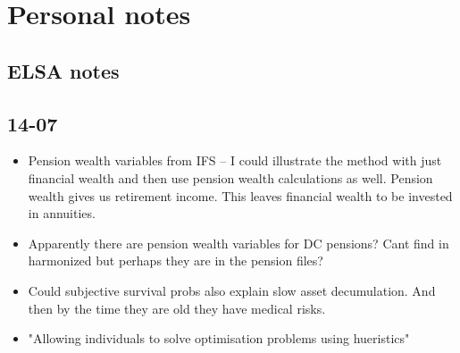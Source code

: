 \documentclass[12pt]{article}
\begin{document}
\section{Personal notes}

\subsection{ELSA notes}

\subsection{\textbf{14-07}}
\begin{itemize}
      \item Pension wealth variables from IFS -- I could illustrate
            the method with just financial wealth and then use pension wealth calculations
            as well. Pension wealth gives us retirement income. This leaves financial wealth to be
            invested in annuities.

      \item Apparently there are pension wealth variables for DC pensions?
            Cant find in harmonized but perhaps they are in the pension files?

      \item Could subjective survival probs also explain slow asset decumulation. And then by the time they are old
            they have medical risks.

      \item "Allowing individuals to solve optimisation problems using hueristics"
\end{itemize}
\end{document}
